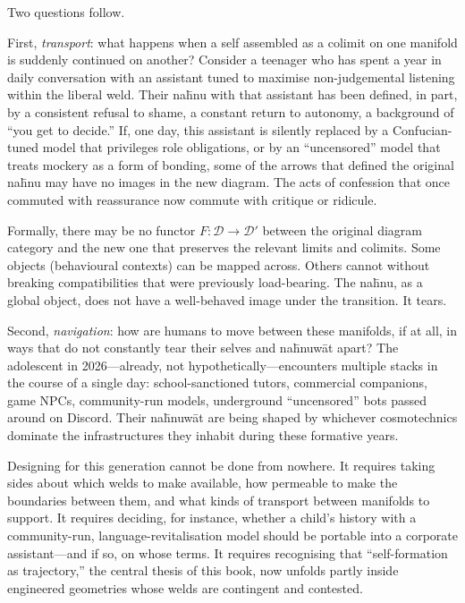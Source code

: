 \documentclass[12pt,a4paper]{article}
\begin{document}
Two questions follow.

First, \emph{transport}: what happens when a self assembled as a colimit on one manifold is suddenly continued on another? Consider a teenager who has spent a year in daily conversation with an assistant tuned to maximise non-judgemental listening within the liberal weld. Their na\={h}nu with that assistant has been defined, in part, by a consistent refusal to shame, a constant return to autonomy, a background of ``you get to decide.'' If, one day, this assistant is silently replaced by a Confucian-tuned model that privileges role obligations, or by an ``uncensored'' model that treats mockery as a form of bonding, some of the arrows that defined the original na\={h}nu may have no images in the new diagram. The acts of confession that once commuted with reassurance now commute with critique or ridicule.

Formally, there may be no functor $F \colon \mathcal{D} \to \mathcal{D}'$ between the original diagram category and the new one that preserves the relevant limits and colimits. Some objects (behavioural contexts) can be mapped across. Others cannot without breaking compatibilities that were previously load-bearing. The na\={h}nu, as a global object, does not have a well-behaved image under the transition. It tears.

Second, \emph{navigation}: how are humans to move between these manifolds, if at all, in ways that do not constantly tear their selves and na\={h}nuw\={a}t apart? The adolescent in 2026---already, not hypothetically---encounters multiple stacks in the course of a single day: school-sanctioned tutors, commercial companions, game NPCs, community-run models, underground ``uncensored'' bots passed around on Discord. Their na\={h}nuw\={a}t are being shaped by whichever cosmotechnics dominate the infrastructures they inhabit during these formative years.

Designing for this generation cannot be done from nowhere. It requires taking sides about which welds to make available, how permeable to make the boundaries between them, and what kinds of transport between manifolds to support. It requires deciding, for instance, whether a child's history with a community-run, language-revitalisation model should be portable into a corporate assistant---and if so, on whose terms. It requires recognising that ``self-formation as trajectory,'' the central thesis of this book, now unfolds partly inside engineered geometries whose welds are contingent and contested.
\end{document}
